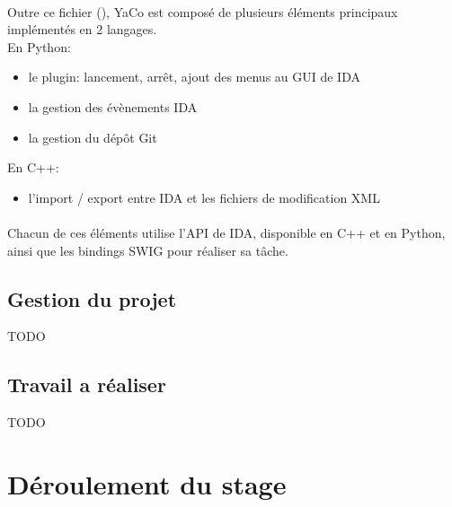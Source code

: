 \documentclass[11pt, book, english, french, standardlists]{upmethodology-document}
\begin{document}
				\paragraph*{}
					Outre ce fichier (), YaCo est composé de plusieurs éléments principaux implémentés en 2 langages.\\
					En Python:
					\begin{itemize}
						\item le plugin: lancement, arrêt, ajout des menus au \gls{GUI} de IDA
						\item la gestion des évènements IDA
						\item la gestion du dépôt Git
					\end{itemize}
					En C++:
					\begin{itemize}
						\item l'import / export entre IDA et les fichiers de modification \gls{XML}
					\end{itemize}
				\paragraph*{}
					Chacun de ces éléments utilise l'\gls{API} de IDA, disponible en C++ et en Python, ainsi que les bindings \gls{SWIG} pour réaliser sa tâche.
			\subsection{Gestion du projet}
				TODO
			\subsection{Travail a réaliser}
				TODO
		\section{Déroulement du stage}
\end{document}
